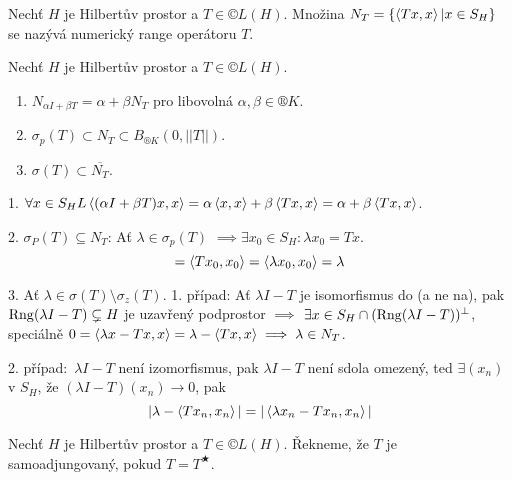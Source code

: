 \documentclass[12pt]{article}					%
\begin{document}
\begin{definice}
	Nechť $H$ je Hilbertův prostor a $T \in ©L(H)$. Množina $N_T = \{\left\langle Tx, x\right\rangle | x \in S_H\}$ se nazývá numerický range operátoru $T$.
\end{definice}

\begin{tvrzeni}
	Nechť $H$ je Hilbertův prostor a $T \in ©L(H)$.

	\begin{enumerate}
		\item $N_{\alpha I + \beta T} = \alpha + \beta N_T$ pro libovolná $\alpha, \beta \in ®K$.
		\item $\sigma_p(T) \subset N_T \subset B_{®K}(0, ||T||)$.
		\item $\sigma(T) \subset \overline{N_T}$.
	\end{enumerate}

	\begin{dukazin}
		1. $\forall x \in S_HL \left\langle(\alpha I + \beta T)x, x\right\rangle = \alpha\left\langle x, x\right\rangle + \beta\left\langle Tx, x\right\rangle = \alpha + \beta\left\langle Tx, x\right\rangle$.

		2. $\sigma_P(T) \subseteq N_T$: Ať $\lambda \in \sigma_p(T)$ $\implies \exists x_0 \in S_H: \lambda x_0 = Tx$.
		$$ = \left\langle Tx_0, x_0\right\rangle = \left\langle\lambda x_0, x_0\right\rangle = \lambda $$

		3. Ať $\lambda \in \sigma(T) \setminus \sigma_z(T)$. 1. případ: Ať $\lambda I - T$ je isomorfismus do (a ne na), pak $\operatorname{Rng}(\lambda I - T) \subsetneq H$ je uzavřený podprostor $\implies$ $\exists x \in S_H \cap (\operatorname{Rng}(\lambda I - T))^\perp$, speciálně $0 = \left\langle\lambda x - Tx, x\right\rangle = \lambda - \left\langle Tx, x\right\rangle \implies \lambda \in N_T$.

		2. případ: $\lambda I - T$ není izomorfismus, pak $\lambda I - T$ není sdola omezený, ted $\exists (x_n)$ v $S_H$, že $(\lambda I - T)(x_n) \rightarrow 0$, pak
		$$ |\lambda - \left\langle Tx_n, x_n\right\rangle| = |\left\langle\lambda x_n - Tx_n, x_n\right\rangle| $$
	\end{dukazin}
\end{tvrzeni}

\begin{definice}
	Nechť $H$ je Hilbertův prostor a $T \in ©L(H)$. Řekneme, že $T$ je samoadjungovaný, pokud $T = T^\bigstar$.
\end{definice}
\end{document}
